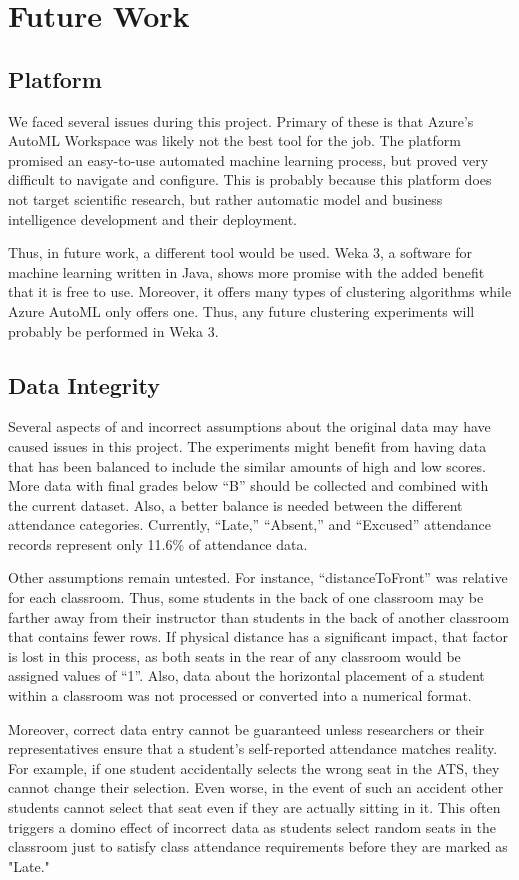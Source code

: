 \section{Future Work}
\subsection{Platform}
We faced several issues during this project. Primary of these is that Azure's AutoML Workspace was likely not the best tool for the job. The platform promised an easy-to-use automated machine learning process, but proved very difficult to navigate and configure. This is probably because this platform does not target scientific research, but rather automatic model and business intelligence development and their deployment.

Thus, in future work, a different tool would be used. Weka 3, a software for machine learning written in Java, shows more promise with the added benefit that it is free to use. Moreover, it offers many types of clustering algorithms while Azure AutoML only offers one. Thus, any future clustering experiments will probably be performed in Weka 3.

\subsection{Data Integrity}
Several aspects of and incorrect assumptions about the original data may have caused issues in this project. The experiments might benefit from having data that has been balanced to include the similar amounts of high and low scores. More data with final grades below ``B'' should be collected and combined with the current dataset. Also, a better balance is needed between the different attendance categories. Currently, ``Late,'' ``Absent,'' and ``Excused'' attendance records represent only 11.6\% of attendance data.

Other assumptions remain untested. For instance, ``distanceToFront'' was relative for each classroom. Thus, some students in the back of one classroom may be farther away from their instructor than students in the back of another classroom that contains fewer rows. If physical distance has a significant impact, that factor is lost in this process, as both seats in the rear of any classroom would be assigned values of ``1''. Also, data about the horizontal placement of a student within a classroom was not processed or converted into a numerical format.

Moreover, correct data entry cannot be guaranteed unless researchers or their representatives ensure that a student's self-reported attendance matches reality. For example, if one student accidentally selects the wrong seat in the ATS, they cannot change their selection. Even worse, in the event of such an accident other students cannot select that seat even if they are actually sitting in it. This often triggers a domino effect of incorrect data as students select random seats in the classroom just to satisfy class attendance requirements before they are marked as "Late."

